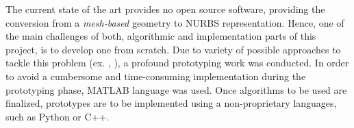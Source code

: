 The current state of the art provides no open source software, providing the conversion from a \textit{mesh-based} geometry to NURBS representation. Hence, one of the main challenges of both, algorithmic and implementation parts of this project, is to develop one from scratch. Due to variety of possible approaches to tackle this problem (ex. \cite{becker2011advanced},\cite{eck1996automatic} ), a profound prototyping work was conducted. In order to avoid a cumbersome and time-consuming implementation during the prototyping phase, MATLAB language was used. Once algorithms to be used are finalized, prototypes are to be implemented using a non-proprietary languages, such as Python or C++.